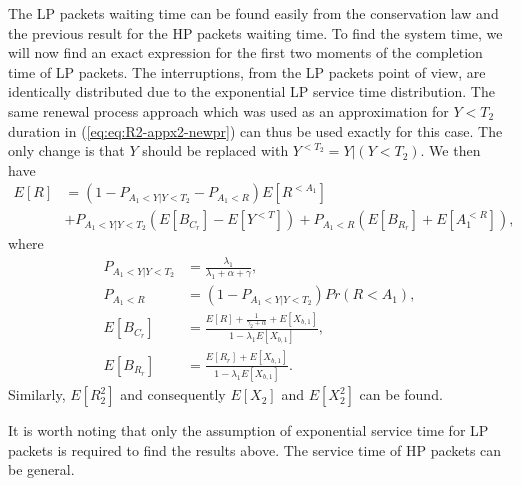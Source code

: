 \documentclass[11pt,journal,oneside,onecolumn,draftclsnofoot]{IEEEtran}
\begin{document}
The LP packets waiting time can be found easily from the conservation law and the previous result for the HP packets waiting time. To find the system time, we will now find an exact expression for the first two moments of the completion time of LP packets. The interruptions, from the LP packets point of view, are identically distributed due to the exponential LP service time distribution.
The same renewal process approach which was used as an approximation for $Y<T_2$ duration in (\ref{eq:eq:R2-appx2-newpr}) can thus be used exactly for this case. The only change is that $Y$ should be replaced with $Y^{<T_2}=Y|(Y<T_2)$.
We then have 
\begin{align}
E[R]&=(1-P_{A_1<Y|Y<T_2}-P_{A_1<R})E[R^{<{A_1}}] \nonumber \\
&+ P_{A_1<Y|Y<T_2}(E[B_{C_r}]-E[Y^{<T}])+P_{A_1<R} (E[B_{R_r}]+E[A_1^{<R}]),  
\end{align}
where 
\begin{align}
P_{A_1<Y|Y<T_2}&=\frac{\lambda_1}{\lambda_1+\alpha+\gamma}, \\
P_{A_1<R}&=(1-P_{A_1<Y|Y<T_2}){Pr(R<A_1)}, \\
E[B_{C_r}]&=\frac{E[R]+\frac{1}{\gamma_2+\alpha}+E[X_{b,1}]}{1-\lambda_1E[X_{b,1}]}, \\
E[B_{R_r}]&=\frac{E[R_{r}]+E[X_{b,1}]}{1-\lambda_1E[X_{b,1}]}.
\end{align}
Similarly, $E[R_2^2]$ and consequently $E[X_2]$ and $E[X^2_2]$ can be found.

It is worth noting that only the assumption of exponential service time for LP packets is required to find the results above. The service time of HP packets can be general. 
\end{document}
